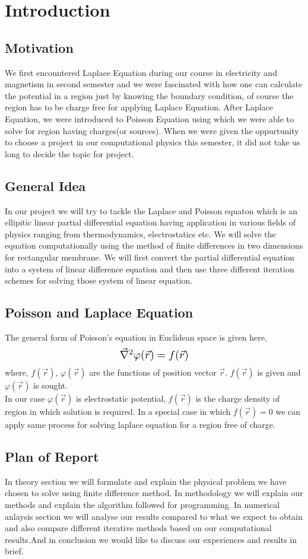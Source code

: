 	\section {Introduction}
    \subsection{Motivation}
    \noindent 
    We first encountered Laplace Equation during our course in electricity and magnetism in second semester and we were fascinated with how one can calculate the potential in a region just by knowing the boundary condition, of course the region has to be charge free for applying Laplace Equation. After Laplace Equation, we were introduced to Poisson Equation using which we were able to solve for region having charges(or sources). When we were given the oppurtunity to choose a project in our computational physics this semester, it did not take us long to decide the topic for project.
    \subsection{General Idea}
    In our project we will try to tackle the Laplace and Poisson equaton which is an ellipitic linear partial differential equation having application in various fields of physics ranging from thermodynamics, electrostatics etc. We will solve the equation computationally using the method of finite differences in two dimensions for rectangular membrane. We will first convert the partial differential equation into a system of linear difference equation and then use three different iteration schemes for solving those system of linear equation.\\ 
    \subsection{Poisson and Laplace Equation}
    	The general form of Poisson's equation in Euclidean space is given here,
    \[
    \scalebox{1.3}{$\vec{\nabla}^2 \varphi(\vec{r}) = f(\vec{r})$}
    \]
    where, $f(\vec{r})$, $\varphi(\vec{r})$ are the functions of position vector $\vec{r}$. $f(\vec{r})$ is given and $\varphi(\vec{r})$ is sought. \\
    In our case  $\varphi(\vec{r})$ is electrostatic potential, $ f(\vec{r})$ is the charge density of region in which solution is required. In a special case in which  $f(\vec{r}) = 0 $ we can apply same process for solving laplace equation for a region free of charge.
    \subsection{Plan of Report}
    In theory section we will formulate and explain the physical problem we have chosen to solve using finite difference method. In methodology we will explain our methods and explain the algorithm followed for programming. In numerical anlaysis section we will analyse our results compared to what we expect to obtain and also compare different iterative methods based on our computational results.And in conclusion we would like to discuss our experiences and results in brief.